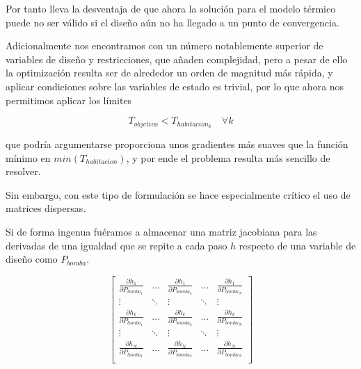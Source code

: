 Por tanto lleva la desventaja de que ahora la solución para el modelo térmico
puede no ser válido si el diseño aún no ha llegado a un punto de convergencia.

Adicionalmente nos encontramos con un número notablemente superior de variables
de diseño y restricciones, que añaden complejidad, pero a pesar de ello la
optimización resulta ser de alrededor un orden de magnitud más rápida, y
aplicar condiciones sobre las variables de estado es trivial, por lo que ahora
nos permitimos aplicar los límites

\begin{equation*}
	T_{objetivo} < T_{habitacion_k} \quad \forall k
\end{equation*}

que podría argumentarse proporciona unos gradientes más suaves que la función
mínimo en $min(T_{habitacion})$, y por ende el problema resulta más sencillo de
resolver.

Sin embargo, con este tipo de formulación se hace especialmente crítico el uso
de matrices dispersas.

Si de forma ingenua fuéramos a almacenar una
matriz jacobiana para las derivadas de una igualdad que se repite a cada paso
$h$ respecto de una variable de diseño como $P_{bomba}$.

\begin{equation} \label{eq:jacobian_matrix_sand}
	\begin{bmatrix}
		\frac{\partial h_1}{\partial P_{bomba_1}} & \ldots & \frac{\partial h_1}{\partial P_{bomba_k}} & \ldots & \frac{\partial h_1}{\partial P_{bomba_N}} \\
		\vdots                                    & \ddots & \vdots                                    & \ddots & \vdots                                    \\
		\frac{\partial h_k}{\partial P_{bomba_1}} & \ldots & \frac{\partial h_k}{\partial P_{bomba_k}} & \ldots & \frac{\partial h_k}{\partial P_{bomba_N}} \\
		\vdots                                    & \ddots & \vdots                                    & \ddots & \vdots                                    \\
		\frac{\partial h_N}{\partial P_{bomba_1}} & \ldots & \frac{\partial h_N}{\partial P_{bomba_k}} & \ldots & \frac{\partial h_N}{\partial P_{bomba_N}} \\
	\end{bmatrix}
\end{equation}

